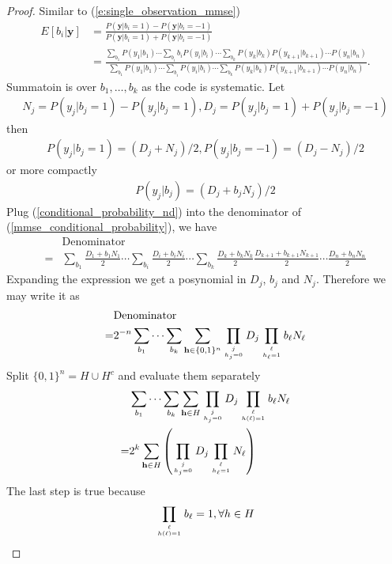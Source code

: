 \documentclass[12pt]{article}
\newcommand{\vect}[1]{\mathbf{#1}}
\begin{document}
\begin{proof}
Similar to (\ref{e:single_observation_mmse})
\begin{align}
E[b_i|\vect{y}] &= \frac{P(\vect{y}|b_i=1)-P(\vect{y}|b_i=-1)}{P(\vect{y}|b_i=1)+P(\vect{y}|b_i=-1)}\\
&=\frac{\sum_{b_1}P(y_1|b_1)\cdots\sum_{b_i}b_iP(y_i|b_i)\cdots\sum_{b_k}P(y_k|b_k)P(y_{k+1}|b_{k+1})\cdots P(y_n|b_n)}{\sum_{b_1}P(y_1|b_1)\cdots\sum_{b_i}P(y_i|b_i)\cdots\sum_{b_k}P(y_k|b_k)P(y_{k+1}|b_{k+1})\cdots P(y_n|b_n)}. \label{mmse_conditional_probability}
\end{align}
Summatoin is over $b_1, \ldots, b_k$ as the code is systematic. Let
\begin{align}
N_j = P(y_j|b_j=1)-P(y_j|b_j=1), D_j = P(y_j|b_j=1)+P(y_j|b_j=-1)
\end{align}
then
\begin{align}
P(y_j|b_j=1) = (D_j+N_j)/2, P(y_j|b_j=-1) = (D_j-N_j)/2
\end{align}
or more compactly
\begin{align}
P(y_j|b_j) = (D_j+b_jN_j)/2 \label{conditional_probability_nd}
\end{align}
Plug (\ref{conditional_probability_nd}) into the denominator of (\ref{mmse_conditional_probability}), we have
\begin{align}
&\text{Denominator}\\
=&\sum_{b_1}\frac{D_1+b_1N_1}{2}\cdots\sum_{b_i}\frac{D_i+b_iN_i}{2}\cdots\sum_{b_k}\frac{D_k+b_kN_k}{2}\frac{D_{k+1}+b_{k+1}N_{k+1}}{2}\cdots\frac{D_n+b_nN_n}{2}
\end{align}
Expanding the expression we get a posynomial in $D_j$, $b_j$ and $N_j$. Therefore we may write it as
\begin{align}
&\text{Denominator}\\
=&2^{-n}\sum_{b_1}\cdots\sum_{b_k}\sum_{\vect{h}\in \{0,1\}^n}\prod_{j\atop h_j = 0}D_j\prod_{\ell\atop h_\ell = 1}b_\ell N_\ell
\end{align}
Split $\{0,1\}^n=H\cup H^c$ and evaluate them separately
\begin{align}
&\sum_{b_1}\cdots\sum_{b_k}\sum_{\vect{h}\in H}\prod_{j\atop h_j = 0}D_j\prod_{\ell\atop h(\ell) = 1}b_\ell N_\ell\\
=&2^k\sum_{\vect{h}\in H}\left(\prod_{j\atop h_j = 0}D_j\prod_{\ell\atop h_\ell = 1} N_\ell\right)
\end{align}
The last step is true because
\begin{align}
\prod_{\ell\atop h(\ell) = 1}b_\ell =1, \forall h\in H

\end{align}
\end{proof}
\end{document}
